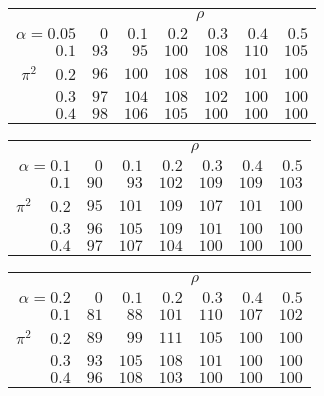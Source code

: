 \begin{tabular}{r|rrrrrr}
\hline\hline
 &\multicolumn{6}{c}{$\rho$} \\ 
 $\alpha = 0.05$ & $0$ & $0.1$ & $0.2$ & $0.3$ & $0.4$ & $0.5$ \\ 
 \hline$0.1$ & $ 93$ & $ 95$ & $100$ & $108$ & $110$ & $105$\\ 
$\pi^2\;\;\;$ $0.2$ & $ 96$ & $100$ & $108$ & $108$ & $101$ & $100$\\ 
$0.3$ & $ 97$ & $104$ & $108$ & $102$ & $100$ & $100$\\ 
$0.4$ & $ 98$ & $106$ & $105$ & $100$ & $100$ & $100$\\ 
 \hline 
 \end{tabular}
 
 \vspace{2em} 
 
\begin{tabular}{r|rrrrrr}
\hline\hline
 &\multicolumn{6}{c}{$\rho$} \\ 
 $\alpha = 0.1$ & $0$ & $0.1$ & $0.2$ & $0.3$ & $0.4$ & $0.5$ \\ 
 \hline$0.1$ & $ 90$ & $ 93$ & $102$ & $109$ & $109$ & $103$\\ 
$\pi^2\;\;\;$ $0.2$ & $ 95$ & $101$ & $109$ & $107$ & $101$ & $100$\\ 
$0.3$ & $ 96$ & $105$ & $109$ & $101$ & $100$ & $100$\\ 
$0.4$ & $ 97$ & $107$ & $104$ & $100$ & $100$ & $100$\\ 
 \hline 
 \end{tabular}
 
 \vspace{2em} 
 
\begin{tabular}{r|rrrrrr}
\hline\hline
 &\multicolumn{6}{c}{$\rho$} \\ 
 $\alpha = 0.2$ & $0$ & $0.1$ & $0.2$ & $0.3$ & $0.4$ & $0.5$ \\ 
 \hline$0.1$ & $ 81$ & $ 88$ & $101$ & $110$ & $107$ & $102$\\ 
$\pi^2\;\;\;$ $0.2$ & $ 89$ & $ 99$ & $111$ & $105$ & $100$ & $100$\\ 
$0.3$ & $ 93$ & $105$ & $108$ & $101$ & $100$ & $100$\\ 
$0.4$ & $ 96$ & $108$ & $103$ & $100$ & $100$ & $100$\\ 
 \hline 
 \end{tabular}